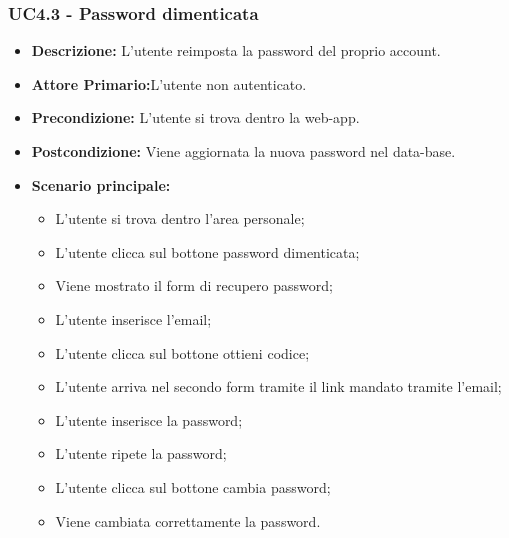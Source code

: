 \subsubsection{UC4.3 - Password dimenticata}
\begin{itemize}
    \item \textbf{Descrizione:} L'utente reimposta la password del proprio account.
    \item \textbf{Attore Primario:}L'utente non autenticato.
    \item \textbf{Precondizione:} L'utente si trova dentro la web-app.
    \item \textbf{Postcondizione:} Viene aggiornata la nuova password nel data-base.
    \item \textbf{Scenario principale:}
    \begin{itemize}
        \item L'utente si trova dentro l'area personale;
        \item L'utente clicca sul bottone password dimenticata;
        \item Viene mostrato il form di recupero password;
        \item L'utente inserisce l'email;
        \item L'utente clicca sul bottone ottieni codice;
        \item L'utente arriva nel secondo form tramite il link mandato tramite l'email;
        \item L'utente inserisce la password;
        \item L'utente ripete la password;
        \item L'utente clicca sul bottone cambia password;
        \item Viene cambiata correttamente la password.
    \end{itemize}
\end{itemize}
